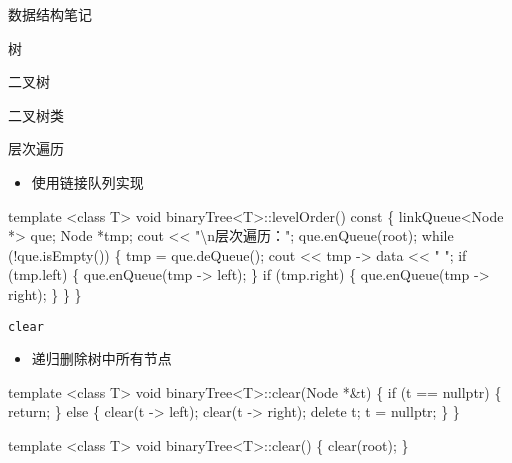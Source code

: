\documentclass[
  ignorenonframetext,
]{beamer}
\newenvironment{Shaded}{}{}
\newcommand{\NormalTok}[1]{#1}
\providecommand{\tightlist}{%
  \setlength{\itemsep}{0pt}\setlength{\parskip}{0pt}}
\begin{document}
\begin{frame}[fragile]{数据结构笔记}
\begin{block}{树}
\begin{block}{二叉树}
\begin{block}{二叉树类}
\begin{block}{层次遍历}
\protect{}\label{ux5c42ux6b21ux904dux5386-1}
\begin{itemize}
\tightlist
\item
  使用链接队列实现
\end{itemize}

\begin{Shaded}
\begin{Highlighting}[]
\NormalTok{template \textless{}class T\textgreater{}}
\NormalTok{void binaryTree\textless{}T\textgreater{}::levelOrder() const}
\NormalTok{\{}
\NormalTok{  linkQueue\textless{}Node *\textgreater{} que;}
\NormalTok{  Node *tmp;}
\NormalTok{  cout \textless{}\textless{} "\textbackslash{}n层次遍历：";}
\NormalTok{  que.enQueue(root);}
\NormalTok{  while (!que.isEmpty())}
\NormalTok{  \{}
\NormalTok{    tmp = que.deQueue();}
\NormalTok{    cout \textless{}\textless{} tmp {-}\textgreater{} data \textless{}\textless{} " ";}
\NormalTok{    if (tmp.left)}
\NormalTok{    \{}
\NormalTok{      que.enQueue(tmp {-}\textgreater{} left);}
\NormalTok{    \}}
\NormalTok{    if (tmp.right)}
\NormalTok{    \{}
\NormalTok{      que.enQueue(tmp {-}\textgreater{} right);}
\NormalTok{    \}}
\NormalTok{  \}}
\NormalTok{\}}
\end{Highlighting}
\end{Shaded}
\end{block}

\begin{block}{\texttt{clear}}
\protect{}\label{clear-1}
\begin{itemize}
\tightlist
\item
  递归删除树中所有节点
\end{itemize}

\begin{Shaded}
\begin{Highlighting}[]
\NormalTok{template \textless{}class T\textgreater{}}
\NormalTok{void binaryTree\textless{}T\textgreater{}::clear(Node *\&t)}
\NormalTok{\{}
\NormalTok{  if (t == nullptr)}
\NormalTok{  \{}
\NormalTok{    return;}
\NormalTok{  \}}
\NormalTok{  else}
\NormalTok{  \{}
\NormalTok{    clear(t {-}\textgreater{} left);}
\NormalTok{    clear(t {-}\textgreater{} right);}
\NormalTok{    delete t;}
\NormalTok{    t = nullptr;}
\NormalTok{  \}}
\NormalTok{\}}
\end{Highlighting}
\end{Shaded}

\begin{Shaded}
\begin{Highlighting}[]
\NormalTok{template \textless{}class T\textgreater{}}
\NormalTok{void binaryTree\textless{}T\textgreater{}::clear()}
\NormalTok{\{}
\NormalTok{  clear(root);}
\NormalTok{\}}
\end{Highlighting}
\end{Shaded}
\end{block}


\end{block}
\end{block}
\end{block}
\end{frame}
\end{document}
